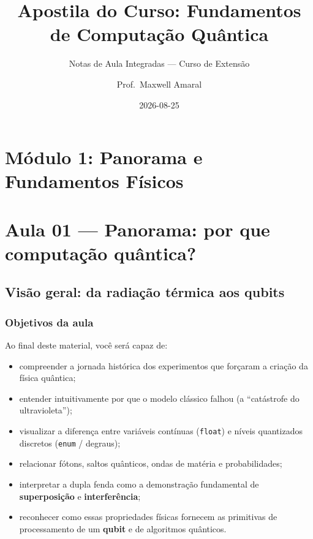 \documentclass[
  brazilian,
]{report}
\title{Apostila do Curso: Fundamentos de Computação Quântica}
\subtitle{Notas de Aula Integradas --- Curso de Extensão}
\author{Prof.~Maxwell Amaral}
\date{2026-08-25}
\providecommand{\tightlist}{%
  \setlength{\itemsep}{0pt}\setlength{\parskip}{0pt}}
\renewcommand*\contentsname{Índice}
\newcommand\contentsname{Índice}
\begin{document}
\maketitle

\renewcommand*\contentsname{Sumário}
{
\setcounter{tocdepth}{2}
\tableofcontents
}

\newpage

\chapter{Módulo 1: Panorama e Fundamentos
Físicos}\label{muxf3dulo-1-panorama-e-fundamentos-fuxedsicos}

\chapter{Aula 01 --- Panorama: por que computação
quântica?}\label{aula-01-panorama-por-que-computauxe7uxe3o-quuxe2ntica}

\section{Visão geral: da radiação térmica aos
qubits}\label{visuxe3o-geral-da-radiauxe7uxe3o-tuxe9rmica-aos-qubits}

\subsection{Objetivos da aula}\label{objetivos-da-aula}

Ao final deste material, você será capaz de:

\begin{itemize}
\tightlist
\item
  compreender a jornada histórica dos experimentos que forçaram a
  criação da física quântica;
\item
  entender intuitivamente por que o modelo clássico falhou (a
  ``catástrofe do ultravioleta'');
\item
  visualizar a diferença entre variáveis contínuas (\texttt{float}) e
  níveis quantizados discretos (\texttt{enum} / degraus);
\item
  relacionar fótons, saltos quânticos, ondas de matéria e
  probabilidades;
\item
  interpretar a dupla fenda como a demonstração fundamental de
  \textbf{superposição} e \textbf{interferência};
\item
  reconhecer como essas propriedades físicas fornecem as primitivas de
  processamento de um \textbf{qubit} e de algoritmos quânticos.
\end{itemize}
\end{document}
